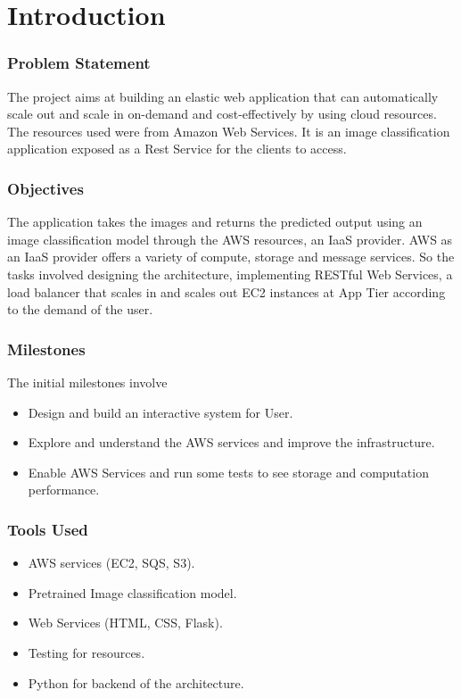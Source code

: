 \documentclass[../main.tex]{subfiles}
\begin{document}
\part*{Introduction}
\section*{Problem Statement}
The project aims at building an elastic web application that can automatically scale out and scale in on-demand and cost-effectively by using cloud resources. The resources used were from Amazon Web Services. It is an image classification application exposed as a Rest Service for the clients to access.

\section*{Objectives}
 The application takes the images and returns the predicted output using an image classification model through the AWS resources, an IaaS provider. AWS as an IaaS provider offers a variety of compute, storage and message services. So the tasks involved designing the architecture, implementing RESTful Web Services, a load balancer that scales in and scales out EC2 instances at App Tier according to the demand of the user.
 
\section*{Milestones}
The initial milestones involve
\begin{itemize}
\item Design and build an interactive system for User.
\item Explore and understand the AWS services and improve the infrastructure.
\item Enable AWS Services and run some tests to see storage and computation performance.
\end{itemize}
\newpage
\section*{Tools Used}
\begin{itemize}
    \item AWS services (EC2, SQS, S3).
    \item Pretrained Image classification model.
    \item Web Services (HTML, CSS, Flask).
    \item Testing for resources.
    \item Python for backend of the architecture.
\end{itemize}
\end{document}
